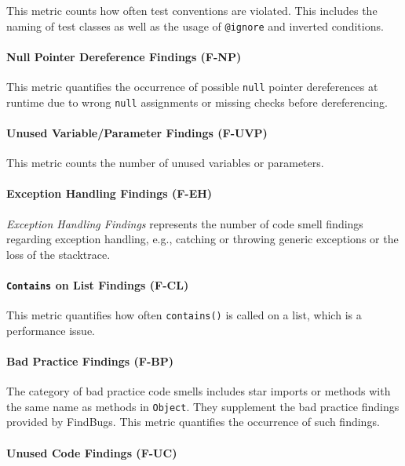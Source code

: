 \documentclass{scrartcl}
\begin{document}
This metric counts how often test conventions are violated. This includes the
naming of test classes as well as the usage of \texttt{@ignore} and inverted
conditions.

\paragraph{Null Pointer Dereference Findings (F-NP)}

This metric quantifies the occurrence of possible \texttt{null} pointer
dereferences at runtime due to wrong \texttt{null} assignments or missing checks
before dereferencing.

\paragraph{Unused Variable/Parameter Findings (F-UVP)}

This metric counts the number of unused variables or parameters.

\paragraph{Exception Handling Findings (F-EH)}

\emph{Exception Handling Findings} represents the number of code smell findings
regarding exception handling, e.g., catching or throwing generic exceptions or
the loss of the stacktrace.

\paragraph{\texttt{Contains} on List Findings (F-CL)}

This metric quantifies how often \texttt{contains()} is called on a list, which
is a performance issue.

\paragraph{Bad Practice Findings (F-BP)}

The category of bad practice code smells includes star imports or methods with
the same name as methods in \texttt{Object}. They supplement the bad practice
findings provided by FindBugs. This metric quantifies the occurrence of such
findings.

\paragraph{Unused Code Findings (F-UC)}
\end{document}
